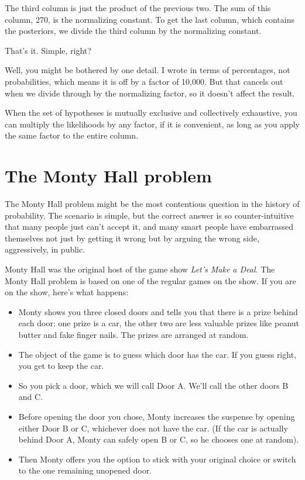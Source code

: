 \documentclass[12pt]{book}
\begin{document}
The third column is just the product of the previous two.
The sum of this column, 270, is the normalizing constant.
To get the last column, which contains the posteriors, we divide
the third column by the normalizing constant.

That's it.  Simple, right?

Well, you might be bothered by one detail.  I wrote 
in terms of percentages, not probabilities, which means it
is off by a factor of 10,000.  But that
cancels out when we divide through by the normalizing factor, so
it doesn't affect the result.

When the set of hypotheses is mutually exclusive and collectively
exhaustive, you can multiply the likelihoods by any factor,
if it is convenient, as long as you apply the same factor to the entire
column.


\section{The Monty Hall problem}

The Monty Hall problem might be the most contentious question in
the history of probability.  The scenario is simple, but the correct
answer is so counter-intuitive that many people just can't accept
it, and many smart people have embarrassed themselves not just by
getting it wrong but by arguing the wrong side, aggressively,
in public.

Monty Hall was the original host of the game show {\em Let's Make a
Deal}.  The Monty Hall problem is based on one of the regular
games on the show.  If you are on the show, here's what happens:

\begin{itemize}

\item Monty shows you three closed doors and tells you that there is a
  prize behind each door: one prize is a car, the other two are less
  valuable prizes like peanut butter and fake finger nails.  The
  prizes are arranged at random.

\item The object of the game is to guess which door has the car.  If
  you guess right, you get to keep the car.

\item So you pick a door, which we will call Door A.  We'll call the
  other doors B and C.

\item Before opening the door you chose, Monty increases the
  suspense by opening either Door B or C, whichever does not
  have the car.  (If the car is actually behind Door A, Monty can
  safely open B or C, so he chooses one at random).

\item Then Monty offers you the option to stick with your original
  choice or switch to the one remaining unopened door.

\end{itemize}
\end{document}
